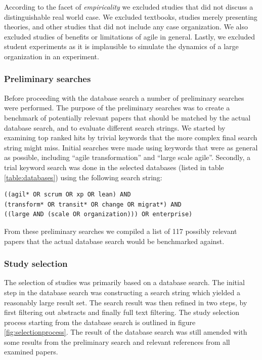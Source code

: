 \documentclass[preprint,authoryear,12pt]{elsarticle}
\begin{document}

According to the facet of \emph{empiricality} we excluded studies that did not
discuss a distinguishable real world case. We excluded textbooks, studies merely
presenting theories, and other studies that did not include any case
organization. We also excluded studies of benefits or limitations of agile in
general. Lastly, we excluded student experiments as it is implausible to
simulate the dynamics of a large organization in an experiment.


\subsubsection{Preliminary searches}

Before proceeding with the database search a number of preliminary searches were
performed. The purpose of the preliminary searches was to create a benchmark of
potentially relevant papers that should be matched by the actual database
search, and to evaluate different search strings. We started by examining top
ranked hits by trivial keywords that the more complex final search string might
miss. Initial searches were made using keywords that were as general as
possible, including ``agile transformation'' and ``large scale agile''.
Secondly, a trial keyword search was done in the selected databases (listed in
table \ref{table:databases}) using the following search string:

\begin{verbatim}
((agil* OR scrum OR xp OR lean) AND
(transform* OR transit* OR change OR migrat*) AND
((large AND (scale OR organization))) OR enterprise)
\end{verbatim}

From these preliminary searches we compiled a list of 117 possibly relevant
papers that the actual database search would be benchmarked against.

\subsubsection{Study selection}

The selection of studies was primarily based on a database search. The initial
step in the database search was constructing a search string which yielded a
reasonably large result set. The search result was then refined in two steps, by
first filtering out abstracts and finally full text filtering. The study
selection process starting from the database search is outlined in figure
\ref{fig:selectionprocess}. The result of the database search was still amended
with some results from the preliminary search and relevant references from all
examined papers.
\end{document}
